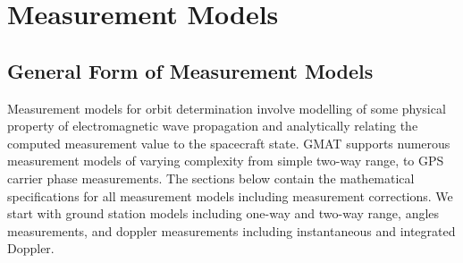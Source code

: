 \section{Measurement Models}

\subsection{General Form of Measurement Models}

Measurement models for orbit determination involve modelling of some
physical property of electromagnetic wave propagation and
analytically relating the computed measurement value to the
spacecraft state. \cite{GTDS:89} GMAT supports numerous measurement
models of varying complexity from simple two-way range, to GPS
carrier phase measurements.  The sections below contain the
mathematical specifications for all measurement models including
measurement corrections.  We start with ground station models
including one-way and two-way range, angles measurements, and
doppler measurements including instantaneous and integrated Doppler.

%


